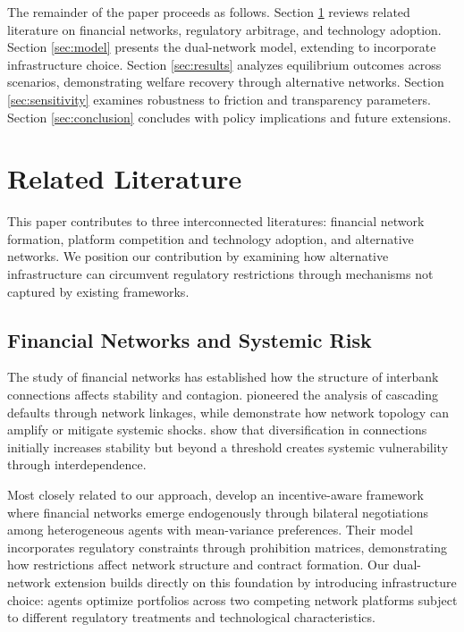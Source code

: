 \documentclass[12pt]{article}
\begin{document}
The remainder of the paper proceeds as follows. Section \ref{sec:literature} reviews related literature on financial networks, regulatory arbitrage, and technology adoption. Section \ref{sec:model} presents the dual-network model, extending \citet{jalan_incentive-aware_2024} to incorporate infrastructure choice. Section \ref{sec:results} analyzes equilibrium outcomes across scenarios, demonstrating welfare recovery through alternative networks. Section \ref{sec:sensitivity} examines robustness to friction and transparency parameters. Section \ref{sec:conclusion} concludes with policy implications and future extensions.


\section{Related Literature}
\label{sec:literature}

This paper contributes to three interconnected literatures: financial network formation, platform competition and technology adoption, and alternative networks. We position our contribution by examining how alternative infrastructure can circumvent regulatory restrictions through mechanisms not captured by existing frameworks.

\subsection{Financial Networks and Systemic Risk}

The study of financial networks has established how the structure of interbank connections affects stability and contagion. \citet{eisenberg_systemic_2001} pioneered the analysis of cascading defaults through network linkages, while \citet{elliott_financial_2014} demonstrate how network topology can amplify or mitigate systemic shocks. \citet{acemoglu_systemic_2015} show that diversification in connections initially increases stability but beyond a threshold creates systemic vulnerability through interdependence.

Most closely related to our approach, \citet{jalan_incentive-aware_2024} develop an incentive-aware framework where financial networks emerge endogenously through bilateral negotiations among heterogeneous agents with mean-variance preferences. Their model incorporates regulatory constraints through prohibition matrices, demonstrating how restrictions affect network structure and contract formation. Our dual-network extension builds directly on this foundation by introducing infrastructure choice: agents optimize portfolios across two competing network platforms subject to different regulatory treatments and technological characteristics.
\end{document}
